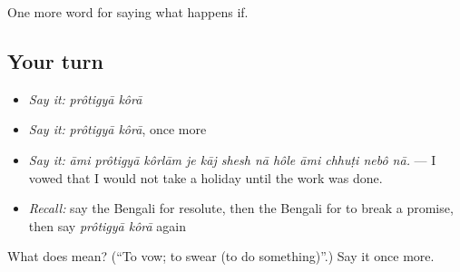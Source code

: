 \begin{grammarlens}[title={What you've built}]
One more word for saying what happens if.
\end{grammarlens}

\subsection*{Your turn}
\begin{itemize}
\raggedright
  \item \emph{Say it:} \emph{prôtigyā kôrā}
  \item \emph{Say it:} \emph{prôtigyā kôrā}, once more
  \item \emph{Say it:} \emph{āmi prôtigyā kôrlām je kāj shesh nā hôle āmi chhuṭi nebô nā.} — I vowed that I would not take a holiday until the work was done.
  \item \emph{Recall:} say the Bengali for resolute, then the Bengali for to break a promise, then say \emph{prôtigyā kôrā} again
\end{itemize}

\begin{tcolorbox}[breakable,colback=teal!4,colframe=teal!35!black,title={Before you move on}]
What does   mean? (\textquotedblleft{}To vow; to swear (to do something)\textquotedblright{}.) Say it once more.
\end{tcolorbox}
